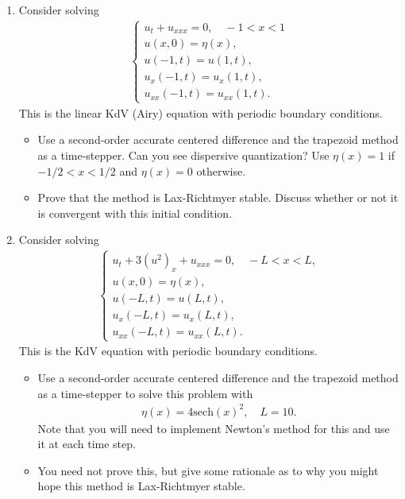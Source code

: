 \documentclass[10pt]{amsart}
\begin{document}
\mline
\begin{enumerate}[label={\bf Problem~{\arabic*}:}]
\item  Consider solving
  \begin{align*}
    \begin{cases} u_t + u_{xxx} = 0, \quad -1 < x < 1\\
      u(x,0) = \eta(x),\\
      u(-1,t) = u(1,t),\\
      u_x(-1,t) = u_x(1,t),\\
      u_{xx}(-1,t) = u_{xx}(1,t).\end{cases}
    \end{align*}
    This is the linear KdV (Airy) equation with periodic boundary conditions.
    \begin{itemize}
    \item Use a second-order accurate centered difference and the trapezoid method as a time-stepper. Can you see dispersive quantization? Use $\eta(x) = 1$ if $-1/2 < x < 1/2$ and $\eta(x) =0$ otherwise.
    \item Prove that the method is Lax-Richtmyer stable.  Discuss whether or not it is convergent with this initial condition.
    \end{itemize}

    \mline

  \item Consider solving
  \begin{align*}
    \begin{cases} u_t + 3 (u^2)_x + u_{xxx} = 0, \quad -L < x < L,\\
      u(x,0) = \eta(x),\\
      u(-L,t) = u(L,t),\\
      u_x(-L,t) = u_x(L,t),\\
      u_{xx}(-L,t) = u_{xx}(L,t).\end{cases}
    \end{align*}
    This is the KdV equation with periodic boundary conditions.
    \begin{itemize}
    \item Use a second-order accurate centered difference and the trapezoid method as a time-stepper to solve this problem with
      \begin{align*}
        \eta(x) = 4 \mathrm{sech}(x)^2, \quad L = 10.
      \end{align*}
      Note that you will need to implement Newton's method for this and use it at each time step.
    \item You need not prove this, but give some rationale as to why you might hope this method is Lax-Richtmyer stable.  
    \end{itemize}
    

\end{enumerate}
\end{document}
